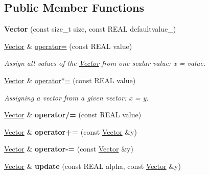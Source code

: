 \subsection*{Public Member Functions}
\begin{DoxyCompactItemize}
\item 
\hypertarget{classhdnum_1_1Vector_a25444a918837812c5cc7ad66e1aa77e2}{
{\bfseries Vector} (const size\_\-t size, const REAL defaultvalue\_)}
\label{classhdnum_1_1Vector_a25444a918837812c5cc7ad66e1aa77e2}

\item 
\hyperlink{classhdnum_1_1Vector}{Vector} \& \hyperlink{classhdnum_1_1Vector_a1cc1f492977e5e6dcf600024b2a75492}{operator=} (const REAL value)
\begin{DoxyCompactList}\small\item\em Assign all values of the \hyperlink{classhdnum_1_1Vector}{Vector} from one scalar value: x = value. \item\end{DoxyCompactList}\item 
\hyperlink{classhdnum_1_1Vector}{Vector} \& \hyperlink{classhdnum_1_1Vector_af410c46d0f56d02d15ff53aecb1b5701}{operator$\ast$=} (const REAL value)
\begin{DoxyCompactList}\small\item\em Assigning a vector from a given vector: x = y. \item\end{DoxyCompactList}\item 
\hypertarget{classhdnum_1_1Vector_ab5ac2b488ae212f37783fb601024c84f}{
\hyperlink{classhdnum_1_1Vector}{Vector} \& {\bfseries operator/=} (const REAL value)}
\label{classhdnum_1_1Vector_ab5ac2b488ae212f37783fb601024c84f}

\item 
\hypertarget{classhdnum_1_1Vector_a642332d4aa66727ae7bb5b6f36688278}{
\hyperlink{classhdnum_1_1Vector}{Vector} \& {\bfseries operator+=} (const \hyperlink{classhdnum_1_1Vector}{Vector} \&y)}
\label{classhdnum_1_1Vector_a642332d4aa66727ae7bb5b6f36688278}

\item 
\hypertarget{classhdnum_1_1Vector_ac6fecb3e3fe595dc19bf7571398608d0}{
\hyperlink{classhdnum_1_1Vector}{Vector} \& {\bfseries operator-\/=} (const \hyperlink{classhdnum_1_1Vector}{Vector} \&y)}
\label{classhdnum_1_1Vector_ac6fecb3e3fe595dc19bf7571398608d0}

\item 
\hypertarget{classhdnum_1_1Vector_a5b6de8d247ad4ed6b62cfcfd6264b958}{
\hyperlink{classhdnum_1_1Vector}{Vector} \& {\bfseries update} (const REAL alpha, const \hyperlink{classhdnum_1_1Vector}{Vector} \&y)}
\label{classhdnum_1_1Vector_a5b6de8d247ad4ed6b62cfcfd6264b958}


\end{DoxyCompactItemize}
